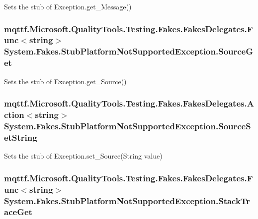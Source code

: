 Sets the stub of Exception.\-get\-\_\-\-Message()

\hypertarget{class_system_1_1_fakes_1_1_stub_platform_not_supported_exception_a0b9312deff1249567d0b5650f1cbdf40}{
\subsubsection[{Source\-Get}]{\setlength{\rightskip}{0pt plus 5cm}mqttf.\-Microsoft.\-Quality\-Tools.\-Testing.\-Fakes.\-Fakes\-Delegates.\-Func$<$string$>$ System.\-Fakes.\-Stub\-Platform\-Not\-Supported\-Exception.\-Source\-Get}}\label{class_system_1_1_fakes_1_1_stub_platform_not_supported_exception_a0b9312deff1249567d0b5650f1cbdf40}


Sets the stub of Exception.\-get\-\_\-\-Source()

\hypertarget{class_system_1_1_fakes_1_1_stub_platform_not_supported_exception_a8a655003c3b60acb57d59cb95b195704}{
\subsubsection[{Source\-Set\-String}]{\setlength{\rightskip}{0pt plus 5cm}mqttf.\-Microsoft.\-Quality\-Tools.\-Testing.\-Fakes.\-Fakes\-Delegates.\-Action$<$string$>$ System.\-Fakes.\-Stub\-Platform\-Not\-Supported\-Exception.\-Source\-Set\-String}}\label{class_system_1_1_fakes_1_1_stub_platform_not_supported_exception_a8a655003c3b60acb57d59cb95b195704}


Sets the stub of Exception.\-set\-\_\-\-Source(\-String value)

\hypertarget{class_system_1_1_fakes_1_1_stub_platform_not_supported_exception_a70989f1b7e24db17c57159971437ac44}{
\subsubsection[{Stack\-Trace\-Get}]{\setlength{\rightskip}{0pt plus 5cm}mqttf.\-Microsoft.\-Quality\-Tools.\-Testing.\-Fakes.\-Fakes\-Delegates.\-Func$<$string$>$ System.\-Fakes.\-Stub\-Platform\-Not\-Supported\-Exception.\-Stack\-Trace\-Get}}\label{class_system_1_1_fakes_1_1_stub_platform_not_supported_exception_a70989f1b7e24db17c57159971437ac44}


